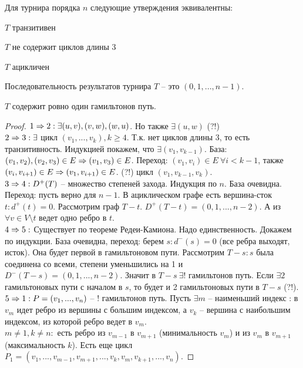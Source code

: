 	\begin{Thm}
		Для турнира порядка $n$ следующие утверждения эквивалентны:
		\begin{MyList}
			\item $T$ транзитивен
			\item $T$ не содержит циклов длины 3
			\item $T$ ацикличен
			\item Последовательность результатов турнира $T$ -- это $(0, 1, ..., n - 1)$.
			\item $T$ содержит ровно один гамильтонов путь.
		\end{MyList}
	\end{Thm}

	\begin{proof}
		$1 \Rightarrow 2 : \exists (u, v), (v, w), (w, u)$. Но также $\exists (u, w)$ (?!) \\
		$2 \Rightarrow 3 : \exists$ цикл $(v_1, ..., v_k), k \geqslant 4$. Т.к. нет циклов длины 3, то есть транзитивность. Индукцией покажем, что $\exists (v_1, v_{k - 1})$. 
		База: $(v_1, v_2), (v_2, v_3) \in E \Rightarrow (v_1, v_3) \in E$. Переход: $(v_1, v_i) \in E \ \forall i < k - 1$, также 
		$(v_i, v_{i + 1}) \in E \Rightarrow (v_1, v_{i + 1}) \in E$. (?!) цикл $(v_1, v_{k - 1}, v_k)$. \\
		$3 \Rightarrow 4 : D^+(T)$ -- множество степеней захода. Индукция по $n$. База очевидна. 
		Переход: пусть верно для $n - 1$. В ациклическом графе есть вершина-сток $t : d^+(t) = 0$. Рассмотрим граф $T - t$. $D^+(T - t) = (0, 1, ..., n - 2)$.
		А из $\forall v \in V \setminus t$ ведет одно ребро в $t$. \\
		$4 \Rightarrow 5 : $ Существует по теореме Редеи-Камиона. Надо единственность. Докажем по индукции. 
		База очевидна, переход: берем $s : d^-(s) = 0$ (все ребра выходят, исток). Она будет первой в гамильтоновом пути.
		Рассмотрим $T - s : s$ была соединена со всеми, степени уменьшились на 1 и $D^-(T - s) = (0, 1, ..., n - 2)$. Значит в $T - s \ \exists !$ гамильтонов путь.
		Если $\exists 2$ гамильтоновых пути с началом в $s$, то будет и 2 гамильтоновых пути в $T - s$ (?!). \\
		$5 \Rightarrow 1 : P = (v_1, ..., v_n)$ -- ! гамильтонов путь. Пусть $\exists m$ -- наименьший индекс : в $v_m$ идет ребро из вершины с большим индексом,
		а $v_k$ -- вершина с наибольшим индексом, из которой ребро ведет в $v_m$. \\
		$m \neq 1, k \neq n : $ есть ребро из $v_{m - 1}$ в $v_{m + 1}$ (минимальность $v_m$) и из $v_m$ в $v_{m + 1}$ (максимальность $k$). 
		Есть еще цикл $P_1 = (v_1, ..., v_{m - 1}, v_{m + 1}, ..., v_k, v_m, v_{k + 1}, ..., v_n)$.
		

\end{proof}
